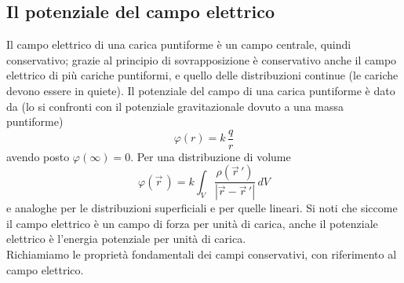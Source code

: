 \subsection{Il potenziale del campo elettrico}

Il campo elettrico di una carica puntiforme \`e un campo centrale, quindi
conservativo; grazie al principio di sovrapposizione \`e conservativo anche il
campo elettrico di pi\`u cariche puntiformi, e quello delle distribuzioni
continue (le cariche devono essere in quiete). Il potenziale del campo di una
carica puntiforme \`e dato da (lo si confronti con il potenziale gravitazionale
dovuto a una massa puntiforme)
\begin{equation}
  \varphi(r)=k\,\frac{q}{r}
  \tag{1.58}
\end{equation}
avendo posto $\varphi(\infty)=0$. Per una distribuzione di volume
\begin{equation}
  \varphi(\vec r\,)=k\int_V\frac{\rho(\vec r\,')}{|\vec r-\vec r\,'|}\,dV
  \tag{1.59}
\end{equation}
e analoghe per le distribuzioni superficiali e per quelle lineari. Si noti che
siccome il campo elettrico \`e un campo di forza per unit\`a di carica, anche il
potenziale elettrico \`e l'energia potenziale per unit\`a di carica.\\
Richiamiamo le propriet\`a fondamentali dei campi conservativi, con riferimento
al campo elettrico.
